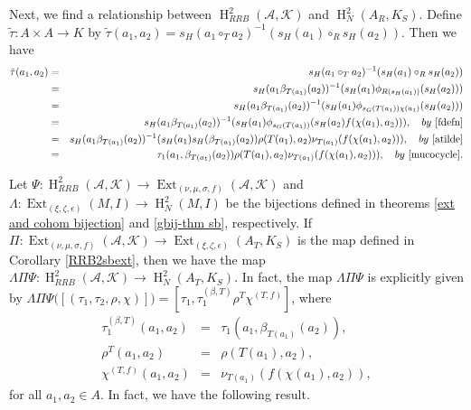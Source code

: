 \documentclass[11pt]{amsart}
\theoremstyle{thrm}
\theoremstyle{plain}
\theoremstyle{definition}
\newcommand{\Ho}{\operatorname{H} }
\newcommand{\Ext}{\operatorname{Ext} }
\numberwithin{equation}{section}
\begin{document}
Next, we find a relationship between $\Ho^2_{RRB}(\mathcal{A}, \mathcal{K})$ and $\Ho^2_N(A_R, K_S)$.  Define $\tilde{\tau}: A \times A \to K$ by $\tilde{\tau}(a_1, a_2) = s_H(a_1 \circ _T a_2)^{-1}(s_H(a_1) \circ_ R s_H(a_2))$. Then we have
\begin{eqnarray*}
	\tilde{\tau}(a_1, a_2) &=& s_H(a_1 \circ _T a_2)^{-1}(s_H(a_1) \circ_ R s_H(a_2))\\
	&=& s_H(a_1 \beta_{T(a_1)}(a_2))^{-1} (s_H(a_1) \phi_{R(s_H(a_1))}(s_H(a_2)))\\
	&=& s_H(a_1 \beta_{T(a_1)}(a_2))^{-1} (   s_H(a_1) \phi_{s_G(T(a_1)) \chi(a_1)}  (s_H(a_2))       )\\
	&=& s_H(a_1 \beta_{T(a_1)}(a_2))^{-1} (s_H(a_1)  \phi_{s_G(T(a_1))}(s_H(a_2) f(\chi(a_1), a_2 )  )  ), \quad \textrm{by}~ \eqref{fdefn} \\
	&=& s_H(a_1 \beta_{T(a_1)}(a_2))^{-1} (s_H(a_1) s_H(\beta_{T(a_1)}(a_2)) \rho(T(a_1), a_2) \nu_{T(a_1)}( f(\chi(a_1), a_2 ))), \quad \textrm{by}~  \eqref{atilde}\\
	&=& \tau_1(a_1, \beta_{T(a_1)}(a_2)) \rho(T(a_1), a_2) \nu_{T(a_1)}( f(\chi(a_1), a_2) )), \quad \textrm{by}~  \eqref{mucocycle}.
\end{eqnarray*}

Let $\Psi:  \Ho^2_{RRB}(\mathcal{A}, \mathcal{K}) \longrightarrow \Ext_{(\nu, \mu, \sigma, f)}(\mathcal{A}, \mathcal{K})$  and $\Lambda:\Ext_{(\xi, \zeta, \epsilon)}(M, I) \longrightarrow \Ho^2_N(M, I)$ be the bijections defined in  theorems \ref{ext and cohom bijection} and \ref{gbij-thm sb}, respectively. If $\Pi: \Ext_{(\nu, \mu, \sigma, f)}(\mathcal{A}, \mathcal{K}) \longrightarrow \Ext_{(\xi, \zeta, \epsilon)}(A_T, K_S)$ is the map defined in Corollary \ref{RRB2sbext}, then we have the map $\Lambda \Pi \Psi: \Ho^2_{RRB}(\mathcal{A}, \mathcal{K}) \to \Ho^2_N(A_T, K_S)$. In fact, the map $\Lambda \Pi \Psi$ is explicitly given by $\Lambda \Pi \Psi\big( [(\tau_1, \tau_2, \rho, \chi)]\big)= [\tau_1, \tau^{(\beta, T)}_1\rho^{T}\chi^{(T, f)} ]$, where 
\begin{eqnarray*}
	\tau^{(\beta, T)}_1(a_1, a_2) &=&  \tau_1(a_1, \beta_{T(a_1)}(a_2)),\\
	\rho^{T}(a_1, a_2) &=& \rho(T(a_1), a_2),\\
	\chi^{(T, f)}(a_1, a_2) & =& \nu_{T(a_1)}( f(\chi(a_1), a_2)),
\end{eqnarray*}
for all $a_1, a_2 \in A$. In fact, we have the following result. 
\end{document}
